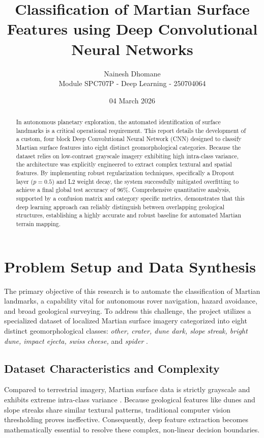 \documentclass[11pt,a4paper]{article}
\title{Classification of Martian Surface Features using Deep Convolutional Neural Networks}
\author{\vspace{-0.5em}\normalsize Nainesh Dhomane \\ 
        \small Module SPC707P - Deep Learning - 250704064}
\date{\vspace{-1.0em}\small 04 March 2026}
\begin{document}
\maketitle

\begin{abstract}
In autonomous planetary exploration, the automated identification of surface landmarks is a critical operational requirement. This report details the development of a custom, four block Deep Convolutional Neural Network (CNN) designed to classify Martian surface features into eight distinct geomorphological categories. Because the dataset relies on low-contrast grayscale imagery exhibiting high intra-class variance, the architecture was explicitly engineered to extract complex textural and spatial features. By implementing robust regularization techniques, specifically a Dropout layer ($p = 0.5$) and L2 weight decay, the system successfully mitigated overfitting to achieve a final global test accuracy of 96\%. Comprehensive quantitative analysis, supported by a confusion matrix and category specific metrics, demonstrates that this deep learning approach can reliably distinguish between overlapping geological structures, establishing a highly accurate and robust baseline for automated Martian terrain mapping.
\end{abstract}

\section{Problem Setup and Data Synthesis}
The primary objective of this research is to automate the classification of Martian landmarks, a capability vital for autonomous rover navigation, hazard avoidance, and broad geological surveying. To address this challenge, the project utilizes a specialized dataset of localized Martian surface imagery categorized into eight distinct geomorphological classes: \textit{other, crater, dune dark, slope streak, bright dune, impact ejecta, swiss cheese,} and \textit{spider} \cite{mars_dataset}.

\subsection{Dataset Characteristics and Complexity}
Compared to terrestrial imagery, Martian surface data is strictly grayscale and exhibits extreme intra-class variance \cite{palafox2017}. Because geological features like dunes and slope streaks share similar textural patterns, traditional computer vision thresholding proves ineffective. Consequently, deep feature extraction becomes mathematically essential to resolve these complex, non-linear decision boundaries. 
\end{document}
